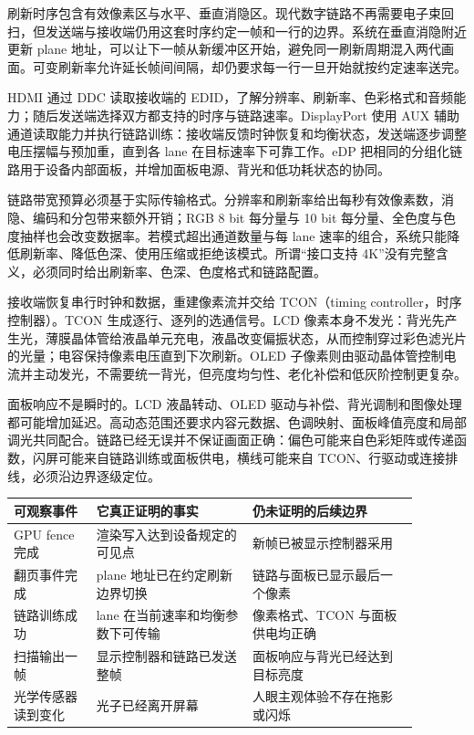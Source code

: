 刷新时序包含有效像素区与水平、垂直消隐区。现代数字链路不再需要电子束回扫，但发送端与接收端仍用这套时序约定一帧和一行的边界。系统在垂直消隐附近更新 plane 地址，可以让下一帧从新缓冲区开始，避免同一刷新周期混入两代画面。可变刷新率允许延长帧间间隔，却仍要求每一行一旦开始就按约定速率送完。


HDMI 通过 DDC 读取接收端的 EDID，了解分辨率、刷新率、色彩格式和音频能力；随后发送端选择双方都支持的时序与链路速率。DisplayPort 使用 AUX 辅助通道读取能力并执行链路训练：接收端反馈时钟恢复和均衡状态，发送端逐步调整电压摆幅与预加重，直到各 lane 在目标速率下可靠工作。eDP 把相同的分组化链路用于设备内部面板，并增加面板电源、背光和低功耗状态的协同。

链路带宽预算必须基于实际传输格式。分辨率和刷新率给出每秒有效像素数，消隐、编码和分包带来额外开销；RGB 8 bit 每分量与 10 bit 每分量、全色度与色度抽样也会改变数据率。若模式超出通道数量与每 lane 速率的组合，系统只能降低刷新率、降低色深、使用压缩或拒绝该模式。所谓“接口支持 4K”没有完整含义，必须同时给出刷新率、色深、色度格式和链路配置。


接收端恢复串行时钟和数据，重建像素流并交给 TCON（timing controller，时序控制器）。TCON 生成逐行、逐列的选通信号。LCD 像素本身不发光：背光先产生光，薄膜晶体管给液晶单元充电，液晶改变偏振状态，从而控制穿过彩色滤光片的光量；电容保持像素电压直到下次刷新。OLED 子像素则由驱动晶体管控制电流并主动发光，不需要统一背光，但亮度均匀性、老化补偿和低灰阶控制更复杂。

面板响应不是瞬时的。LCD 液晶转动、OLED 驱动与补偿、背光调制和图像处理都可能增加延迟。高动态范围还要求内容元数据、色调映射、面板峰值亮度和局部调光共同配合。链路已经无误并不保证画面正确：偏色可能来自色彩矩阵或传递函数，闪屏可能来自链路训练或面板供电，横线可能来自 TCON、行驱动或连接排线，必须沿边界逐级定位。

\begin{longtable}{L{0.18\linewidth}L{0.34\linewidth}L{0.36\linewidth}}
\toprule
可观察事件 & 它真正证明的事实 & 仍未证明的后续边界 \\
\midrule
GPU fence 完成 & 渲染写入达到设备规定的可见点 & 新帧已被显示控制器采用 \\\tablerowrule
翻页事件完成 & plane 地址已在约定刷新边界切换 & 链路与面板已显示最后一个像素 \\\tablerowrule
链路训练成功 & lane 在当前速率和均衡参数下可传输 & 像素格式、TCON 与面板供电均正确 \\\tablerowrule
扫描输出一帧 & 显示控制器和链路已发送整帧 & 面板响应与背光已经达到目标亮度 \\\tablerowrule
光学传感器读到变化 & 光子已经离开屏幕 & 人眼主观体验不存在拖影或闪烁 \\
\bottomrule
\end{longtable}

